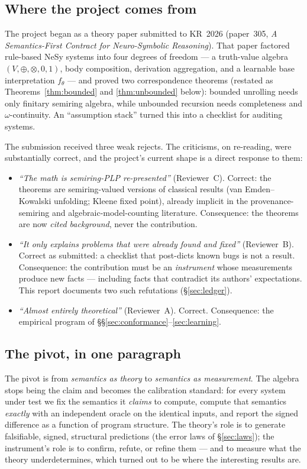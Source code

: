 \documentclass[10pt]{article}
\theoremstyle{remark}
\begin{document}
\subsection{Where the project comes from}

The project began as a theory paper submitted to KR~2026 (paper~305, \emph{A Semantics-First
Contract for Neuro-Symbolic Reasoning}). That paper factored rule-based NeSy systems into four
degrees of freedom --- a truth-value algebra $(V,\oplus,\otimes,0,1)$, body composition, derivation
aggregation, and a learnable base interpretation $f_\theta$ --- and proved two correspondence
theorems (restated as Theorems~\ref{thm:bounded} and \ref{thm:unbounded} below): bounded unrolling
needs only finitary semiring algebra, while unbounded recursion needs completeness and
$\omega$-continuity. An ``assumption stack'' turned this into a checklist for auditing systems.

The submission received three weak rejects. The criticisms, on re-reading, were substantially
correct, and the project's current shape is a direct response to them:

\begin{itemize}[leftmargin=2em]
\item \emph{``The math is semiring-PLP re-presented''} (Reviewer~C). Correct: the theorems are
semiring-valued versions of classical results (van Emden--Kowalski unfolding; Kleene fixed point),
already implicit in the provenance-semiring and algebraic-model-counting literature. Consequence:
the theorems are now \emph{cited background}, never the contribution.
\item \emph{``It only explains problems that were already found and fixed''} (Reviewer~B).
Correct as submitted: a checklist that post-dicts known bugs is not a result. Consequence: the
contribution must be an \emph{instrument} whose measurements produce new facts --- including facts
that contradict its authors' expectations. This report documents two such refutations
(\S\ref{sec:ledger}).
\item \emph{``Almost entirely theoretical''} (Reviewer~A). Correct. Consequence: the empirical
program of \S\S\ref{sec:conformance}--\ref{sec:learning}.
\end{itemize}

\subsection{The pivot, in one paragraph}

The pivot is from \emph{semantics as theory} to \emph{semantics as measurement}. The algebra stops
being the claim and becomes the calibration standard: for every system under test we fix the
semantics it \emph{claims} to compute, compute that semantics \emph{exactly} with an independent
oracle on the identical inputs, and report the signed difference as a function of program
structure. The theory's role is to generate falsifiable, signed, structural predictions (the error
laws of \S\ref{sec:laws}); the instrument's role is to confirm, refute, or refine them --- and to
measure what the theory underdetermines, which turned out to be where the interesting results are.
\end{document}
